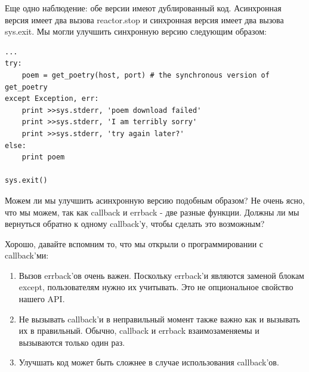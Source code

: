 Еще одно наблюдение: обе версии имеют дублированный код. 
Асинхронная версия имеет два вызова reactor.stop и 
синхронная версия имеет два вызова sys.exit. Мы могли 
улучшить синхронную версию следующим образом:

\begin{scriptsize}\begin{verbatim}
...
try:
    poem = get_poetry(host, port) # the synchronous version of get_poetry
except Exception, err:
    print >>sys.stderr, 'poem download failed'
    print >>sys.stderr, 'I am terribly sorry'
    print >>sys.stderr, 'try again later?'
else:
    print poem

sys.exit()
\end{verbatim}\end{scriptsize}


Можем ли мы улучшить асинхронную версию подобным образом? 
Не очень ясно, что мы можем, так как callback и errback - 
две разные функции. Должны ли мы вернуться обратно к 
одному callback'у, чтобы сделать это возможным?


Хорошо, давайте вспомним то, что мы открыли о программировании 
с callback'ми:

\begin{enumerate}
\item Вызов errback'ов очень важен. Поскольку errback'и являются 
заменой блокам except, пользователям нужно их учитывать. Это не 
опциональное свойство нашего API.

\item Не вызывать callback'и в неправильный момент также 
важно как и вызывать их в правильный. Обычно, callback и errback взаимозаменяемы и 
вызываются только один раз.

\item Улучшать код может быть сложнее в случае использования callback'ов.
\end{enumerate}


